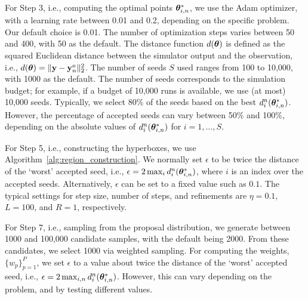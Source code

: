 For Step 3, i.e., computing the optimal points \(\boldsymbol{\theta}_{i,n}^*\), we use the Adam optimizer, with a learning rate between 0.01 and 0.2, depending on the specific problem. Our default choice is 0.01. The number of optimization steps varies between 50 and 400, with 50 as the default. The distance function \(d(\boldsymbol{\theta})\) is defined as the squared Euclidean distance between the simulator output and the observation, i.e., \(d(\boldsymbol{\theta}) = \|\mathbf{y} - \mathbf{y}^o_n\|^2_2\).
The number of seeds \(S\) used ranges from 100 to 10{,}000, with 1000 as the default.
The number of seeds corresponds to the simulation budget; for example, if a budget of 10,000 runs is available, we use (at most) 10,000 seeds.
Typically, we select 80\% of the seeds based on the best \(d_i^n(\boldsymbol{\theta}_{i,n}^*)\).
However, the percentage of accepted seeds can vary between 50\% and 100\%, depending on the absolute values of \(d_i^n(\boldsymbol{\theta}_{i,n}^*)\) for \(i = 1, \dots, S\).

For Step 5, i.e., constructing the hyperboxes, we use Algorithm~\ref{alg:region_construction}. We normally set \(\epsilon\) to be twice the distance of the `worst' accepted seed, i.e., \(\epsilon = 2 \max_i d_i^n(\boldsymbol{\theta}_{i,n}^*)\), where \(i\) is an index over the accepted seeds. Alternatively, \(\epsilon\) can be set to a fixed value such as $0.1$. The typical settings for step size, number of steps, and refinements are \(\eta = 0.1\), \(L = 100\), and \(R = 1\), respectively.

For Step 7, i.e., sampling from the proposal distribution, we generate between 1000 and 100,000 candidate samples, with the default being 2000. From these candidates, we select 1000 via weighted sampling.
For computing the weights, $\{w_p\}_{p=1}^{P}$, we set $\epsilon$ to a value about twice the distance of the `worst' accepted seed, i.e., $\epsilon = 2 \max_{i,n} d_i^n(\boldsymbol{\theta}_{i,n}^*)$. However, this can vary depending on the problem, and by testing different values.


